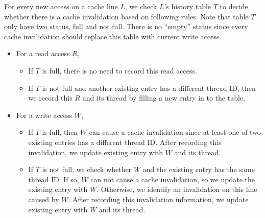 \begin{comment}
\begin{table}
\centering
  \begin{tabular}{ l | r }
    \hline
    {Thread ID} & {Type of Access} \\ \hline
    \hline
     &   \\ \hline
     &   \\ \hline
  \end{tabular}
  \caption{Two-entries-cache-history table for every cache line. \label{table:cachehistory}}
\end{table} 
\end{comment}


For every new access on a cache line $L$, we check $L$'s history table
$T$ to decide whether there is a cache invalidation based on following rules.
Note that table $T$ only have two status, full and not full. 
There is no ``empty'' status since every cache invalidation should 
replace this table with current write access.

\begin{itemize}
\item
  For a read access $R$, 
  \begin{itemize}
    \item
      If $T$ is full, there is no need to record this read access.
    \item
      If $T$ is not full and another existing entry has a different thread
      ID, then we record this $R$ and its thread by filling a new entry in to the table. 
  \end{itemize}
\item
  For a write access $W$, 
  \begin{itemize}
    \item
      If $T$ is full, then $W$ can cause a cache invalidation since at least 
      one of two existing entries has a different thread ID.
      After recording this invalidation, we update 
      existing entry with $W$ and its thread.
    \item
      If $T$ is not full,
      we check whether $W$ and the existing entry has the same thread ID. If
      so, $W$ can not cause a cache invalidation, so we update the existing
      entry with $W$. Otherwise, we identify an invalidation on this line caused by $W$. 
      After recording this invalidation information, we update 
      existing entry with $W$ and its thread.
  \end{itemize}
\end{itemize}

